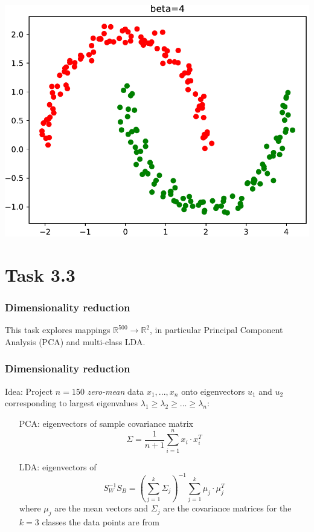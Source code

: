 \documentclass{beamer}
\begin{document}
\begin{frame}
\begin{overprint}
		\includegraphics[width=\linewidth]{graphics/task_3_2_spectral4}
	\end{overprint}
\end{frame}

\section{Task 3.3}
\begin{frame}
	\frametitle{Dimensionality reduction}
	This task explores mappings $\mathbb{R}^{500} \to \mathbb{R}^2$, in particular Principal Component Analysis (PCA) and multi-class LDA.
\end{frame}

\begin{frame}
	\frametitle{Dimensionality reduction}
	Idea: Project $n=150$ \emph{zero-mean} data $x_1,...,x_n$ onto eigenvectors $u_1$ and $u_2$ corresponding to largest eigenvalues $\lambda_1 \geq \lambda_2 \geq ... \geq \lambda_n$:
	\begin{itemize}
	\item[PCA:] eigenvectors of sample covariance matrix 
	\[\Sigma = \frac{1}{n+1} \sum_{i=1}^n x_i \cdot x_i^T\]
	\item[LDA:] eigenvectors of
	\[S_W^{-1}S_B = \left(\sum_{j=1}^k \Sigma_j\right)^{-1} \sum_{j=1}^k \mu_j \cdot \mu_j^T\]
	where $\mu_j$ are the mean vectors and $\Sigma_j$ are the covariance matrices for the $k=3$ classes the data points are from
	\end{itemize}
\end{frame}
\end{document}

